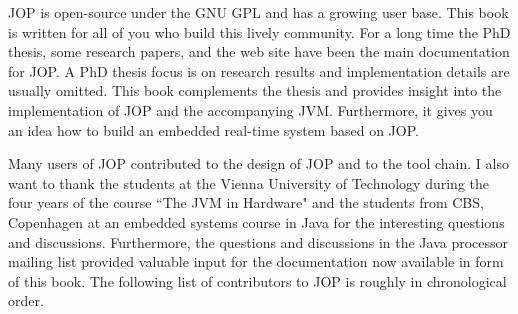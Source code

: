 JOP is open-source under the GNU GPL and has a growing user base.
This book is written for all of you who build this lively community.
For a long time the PhD thesis, some research papers, and the web
site have been the main documentation for JOP. A PhD thesis focus is
on research results and implementation details are usually omitted.
This book complements the thesis and provides insight into the
implementation of JOP and the accompanying JVM. Furthermore, it gives
you an idea how to build an embedded real-time system based on JOP.

%


Many users of JOP contributed to the design of JOP and to the tool
chain. I also want to thank the students at the Vienna University of
Technology during the four years of the course ``The JVM in Hardware"
and the students from CBS, Copenhagen at an embedded systems course
in Java for the interesting questions and discussions. Furthermore,
the questions and discussions in the Java processor mailing list
provided valuable input for the documentation now available in form
of this book. The following list of contributors to JOP is roughly in
chronological order.

